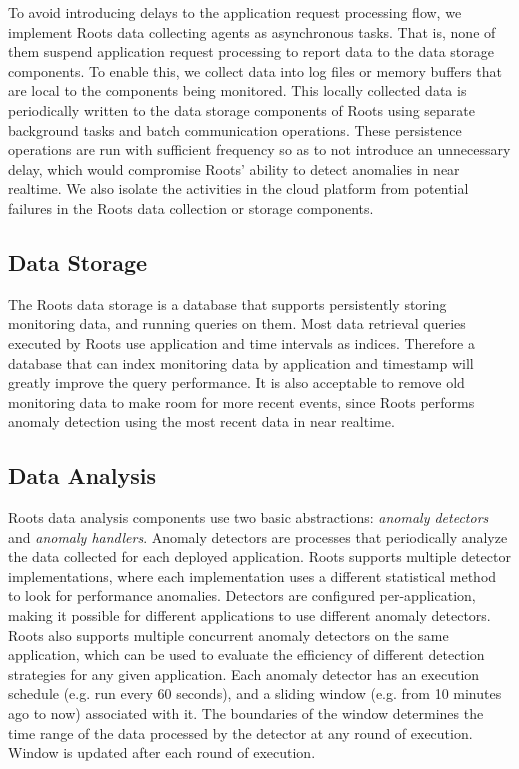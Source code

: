 To avoid introducing delays to the application request processing flow, we implement
Roots data collecting agents as asynchronous tasks. That is, none of them 
suspend application request processing to report data to the data storage components.
To enable this, we collect data into log files or memory buffers that are local to the 
components being monitored. This locally collected data is periodically written to
the data storage components of Roots using separate background tasks and batch communication
operations. These persistence operations are run with sufficient frequency so as to not
introduce an unnecessary delay, which would compromise Roots' ability to detect anomalies in
near realtime. We also isolate the activities in the cloud platform from potential
failures in the Roots data collection or storage components.

\subsection{Data Storage}

The Roots data storage is a database that supports persistently storing monitoring data, and running
queries on them.  
Most data retrieval queries executed
by Roots use application and time intervals as indices. Therefore a database that can index monitoring
data by application and timestamp will greatly improve the query performance.
It is also acceptable to remove old monitoring data to make room for more recent events, since Roots
performs anomaly detection using the most recent data in near realtime.

\subsection{Data Analysis}

Roots data analysis components use two basic abstractions: \textit{anomaly detectors} 
and \textit{anomaly handlers}.
Anomaly detectors are processes that periodically analyze the data collected for
each deployed application. Roots supports multiple detector implementations, where each implementation
uses a different statistical method to look for performance anomalies. Detectors are configured
per-application, making it possible for different applications to use different anomaly 
detectors. Roots also supports multiple concurrent anomaly detectors on the same application, which can be used
to evaluate the efficiency of different detection strategies for any given application. Each
anomaly detector has an execution schedule (e.g. run every 60 seconds), and a sliding window 
(e.g. from 10 minutes ago to now)
associated with it. The boundaries of the window determines the time range
of the data processed by the detector at any round of execution. Window is updated 
after each round of execution. 

